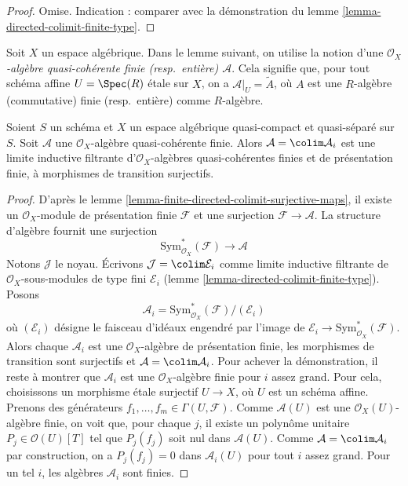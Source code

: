 \begin{proof}
Omise. Indication : comparer avec la démonstration du
lemme \ref{lemma-directed-colimit-finite-type}.
\end{proof}

\noindent
Soit $X$ un espace algébrique. Dans le lemme suivant, on utilise la notion
d'une {\it $\mathcal{O}_X$-algèbre quasi-cohérente finie (resp.\ entière)
$\mathcal{A}$}. Cela signifie que, pour tout schéma
affine $U = \Spec(R)$ étale sur $X$, on a
$\mathcal{A}|_U = \widetilde{A}$, où $A$ est une $R$-algèbre (commutative)
finie (resp.\ entière) comme $R$-algèbre.

\begin{lemma}
\label{lemma-finite-algebra-directed-colimit-finite-finitely-presented}
Soient $S$ un schéma et $X$ un espace algébrique quasi-compact et quasi-séparé
sur $S$. Soit $\mathcal{A}$ une $\mathcal{O}_X$-algèbre quasi-cohérente
finie. Alors $\mathcal{A} = \colim \mathcal{A}_i$
est une limite inductive filtrante d'$\mathcal{O}_X$-algèbres quasi-cohérentes
finies et de présentation finie, à morphismes de transition surjectifs.
\end{lemma}

\begin{proof}
D'après le lemme \ref{lemma-finite-directed-colimit-surjective-maps},
il existe un $\mathcal{O}_X$-module de présentation finie
$\mathcal{F}$ et une surjection $\mathcal{F} \to \mathcal{A}$.
La structure d'algèbre fournit une surjection
$$
\text{Sym}^*_{\mathcal{O}_X}(\mathcal{F}) \longrightarrow \mathcal{A}
$$
Notons $\mathcal{J}$ le noyau. Écrivons $\mathcal{J} = \colim \mathcal{E}_i$
comme limite inductive filtrante de $\mathcal{O}_X$-sous-modules de type fini
$\mathcal{E}_i$ (lemme \ref{lemma-directed-colimit-finite-type}). Posons
$$
\mathcal{A}_i = \text{Sym}^*_{\mathcal{O}_X}(\mathcal{F})/(\mathcal{E}_i)
$$
où $(\mathcal{E}_i)$ désigne le faisceau d'idéaux engendré par
l'image de $\mathcal{E}_i \to \text{Sym}^*_{\mathcal{O}_X}(\mathcal{F})$.
Alors chaque $\mathcal{A}_i$ est une $\mathcal{O}_X$-algèbre de présentation finie,
les morphismes de transition sont surjectifs et $\mathcal{A} = \colim \mathcal{A}_i$.
Pour achever la démonstration, il reste
à montrer que $\mathcal{A}_i$ est une $\mathcal{O}_X$-algèbre finie
pour $i$ assez grand. Pour cela, choisissons un morphisme étale surjectif
$U \to X$, où $U$ est un schéma affine. Prenons des générateurs
$f_1, \ldots, f_m \in \Gamma(U, \mathcal{F})$.
Comme $\mathcal{A}(U)$ est une $\mathcal{O}_X(U)$-algèbre finie,
on voit que, pour chaque $j$, il existe un polynôme unitaire
$P_j \in \mathcal{O}(U)[T]$ tel que $P_j(f_j)$ soit nul dans $\mathcal{A}(U)$.
Comme $\mathcal{A} = \colim \mathcal{A}_i$ par construction,
on a $P_j(f_j) = 0$ dans $\mathcal{A}_i(U)$ pour tout $i$ assez grand.
Pour un tel $i$, les algèbres $\mathcal{A}_i$ sont finies.
\end{proof}

